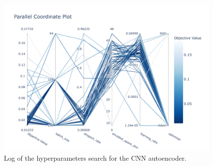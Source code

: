 \documentclass[11pt,a4paper]{scrartcl}
\begin{document}
\begin{figure}[htp]
    \centering
    \includegraphics[width=\textwidth]{../Code/Plots/hyperparameters}
    \caption{Log of the hyperparameters search for the CNN autoencoder.\label{fig:cnn_hyperparameters}}
\end{figure}


\end{document}
